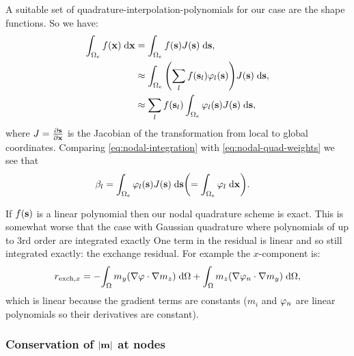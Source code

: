 A suitable set of quadrature-interpolation-polynomials for our case are the shape functions.
So we have:
\begin{equation}
  \label{eq:nodal-quad-weights}
  \begin{aligned}
    \int_{\Omega_e} f(\mathbf{x}) {\; \text{d}} \mathbf{x} &= \int_{\Omega_e} f({\mathbf{s}}) J({\mathbf{s}}) {\; \text{d}} {\mathbf{s}}, \\
    &\approx \int_{\Omega_e} {\left( \sum_l f({\mathbf{s}}_l) \varphi_l({\mathbf{s}}) \right)} J({\mathbf{s}}) {\; \text{d}} {\mathbf{s}}, \\
    &\approx \sum_l f({\mathbf{s}}_l) \int_{\Omega_e} \varphi_l({\mathbf{s}}) J({\mathbf{s}}) {\; \text{d}} {\mathbf{s}},
  \end{aligned} 
\end{equation}
where $J =  \frac{\partial {\mathbf{s}}}{\partial \mathbf{x}}$ is the Jacobian of the transformation from local to global coordinates.
Comparing \cref{eq:nodal-integration} with \cref{eq:nodal-quad-weights} we see that
\begin{equation}
  \begin{aligned}
    \beta_l &= \int_{\Omega_e} \varphi_l({\mathbf{s}}) J({\mathbf{s}}) {\; \text{d}} {\mathbf{s}} {\left( = \int_{\Omega_e} \varphi_l {\; \text{d}}\mathbf{x} \right)}.
  \end{aligned} 
\end{equation}

If $f({\mathbf{s}})$ is a linear polynomial then our nodal quadrature scheme is exact.
This is somewhat worse that the case with Gaussian quadrature where polynomials of up to 3rd order are integrated exactly
One term in the residual is linear and so still integrated exactly: the exchange residual. For example the $x$-component is:
\begin{equation}
  \begin{aligned}
    r_{\text{exch},x} = - {\int_{\Omega}  m_y {\left( \nabla \varphi \cdot \nabla m_z \right)} {\; \text{d}} {\Omega}} + {\int_{\Omega}  m_z {\left( \nabla \varphi_n \cdot \nabla m_y \right)} {\; \text{d}} {\Omega}},
  \end{aligned}
\end{equation}
which is linear because the gradient terms are constants ($m_i$ and $\varphi_n$ are linear polynomials so their derivatives are constant).


\subsubsection{Conservation of $\left|{\mathbf{m}} \right|$ at nodes}
\label{sec:weak-cons-absmv}

